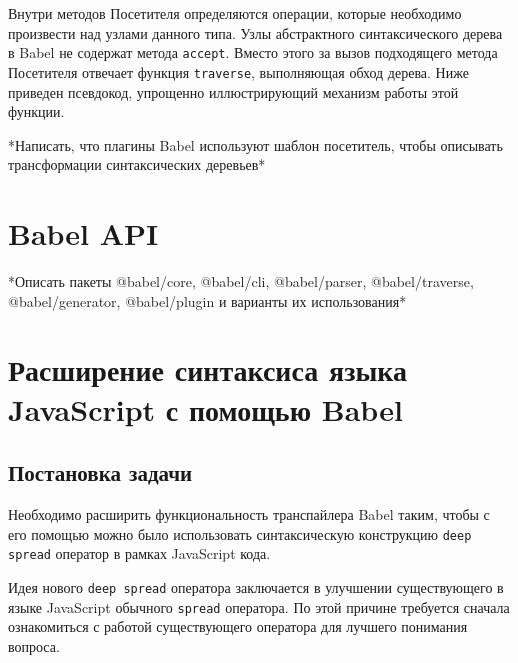 \documentclass[14pt, a4paper]{article}
\def\code#1{\texttt{#1}} %
\begin{document}
Внутри методов Посетителя определяются операции, которые необходимо произвести над узлами данного типа.
Узлы абстрактного синтаксического дерева в Babel не содержат метода \code{accept}. Вместо этого за вызов
подходящего метода Посетителя отвечает функция \code{traverse}, выполняющая обход дерева. Ниже приведен 
псевдокод, упрощенно иллюстрирующий механизм работы этой функции.



 *Написать, что плагины Babel используют шаблон посетитель, чтобы описывать трансформации синтаксических деревьев*

\pagebreak

\section{Babel API}

*Описать пакеты @babel/core, @babel/cli, @babel/parser, @babel/traverse, @babel/generator, @babel/plugin и варианты их использования* 
 

\pagebreak

\section{Расширение синтаксиса языка JavaScript с помощью Babel}
\subsection{Постановка задачи}
Необходимо расширить функциональность транспайлера Babel таким, чтобы с его помощью можно было использовать 
синтаксическую конструкцию \code{deep spread} оператор в рамках JavaScript кода. 

Идея нового \code{deep spread} оператора заключается в улучшении существующего в языке JavaScript обычного \code{spread}
оператора. По этой причине требуется сначала ознакомиться с работой существующего оператора для лучшего понимания вопроса.
\end{document}
